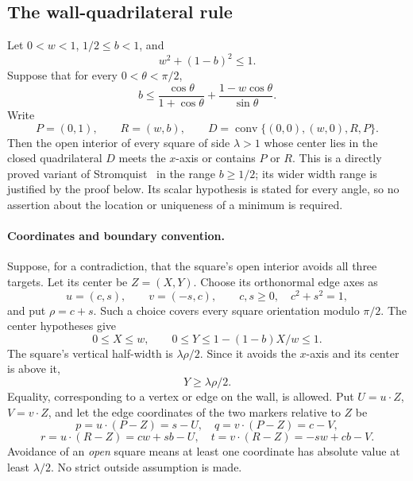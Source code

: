 \documentclass[11pt]{article}
\begin{document}
\subsection{The wall-quadrilateral rule}
Let $0<w<1$, $1/2\le b<1$, and
\[
 w^2+(1-b)^2\le1.
\]
Suppose that for every $0<\theta<\pi/2$,
\begin{equation}\label{eq:independent-wall-hypothesis}
 b\le \frac{\cos\theta}{1+\cos\theta}
       +\frac{1-w\cos\theta}{\sin\theta}.
\end{equation}
Write
\[
 P=(0,1),\qquad R=(w,b),\qquad
 D=\operatorname{conv}\{(0,0),(w,0),R,P\}.
\]
Then the open interior of every square of side $\lambda>1$ whose center
lies in the closed quadrilateral $D$ meets the $x$-axis or contains $P$ or
$R$. This is a directly proved variant of Stromquist\textup{~\cite[Lemma~4, pp.~3--4]{stromquist}} in the range $b\ge1/2$; its wider width range is justified by the proof below. Its scalar hypothesis is stated for every angle, so no assertion about the location or uniqueness of a minimum is required.

\paragraph{Coordinates and boundary convention.}
Suppose, for a contradiction, that the square's open interior avoids all
three targets. Let its center be $Z=(X,Y)$. Choose its orthonormal edge
axes as
\[
 u=(c,s),\qquad v=(-s,c),\qquad c,s\ge0,\quad c^2+s^2=1,
\]
and put $\rho=c+s$. Such a choice covers every square orientation modulo
$\pi/2$. The center hypotheses give
\[
 0\le X\le w,\qquad 0\le Y\le1-(1-b)X/w\le1.
\]
The square's vertical half-width is $\lambda\rho/2$. Since it avoids the
$x$-axis and its center is above it,
\begin{equation}\label{eq:wall-bottom}
 Y\ge\lambda\rho/2.
\end{equation}
Equality, corresponding to a vertex or edge on the wall, is allowed.
Put $U=u\cdot Z$, $V=v\cdot Z$, and let the edge coordinates of the two
markers relative to $Z$ be
\[
 p=u\cdot(P-Z)=s-U,\quad q=v\cdot(P-Z)=c-V,
\]
\[
 r=u\cdot(R-Z)=cw+sb-U,\quad t=v\cdot(R-Z)=-sw+cb-V.
\]
Avoidance of an \emph{open} square means at least one coordinate has
absolute value at least $\lambda/2$. No strict outside assumption is made.
\end{document}
